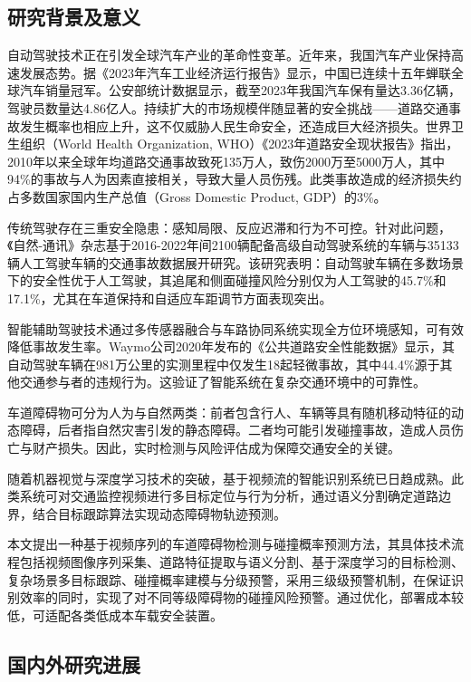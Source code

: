 \documentclass[a4paper, UTF8, fontsize=12pt]{ctexart} %
\numberwithin{equation}{section} %
\begin{document}
\subsection{研究背景及意义}

自动驾驶技术正在引发全球汽车产业的革命性变革。近年来，我国汽车产业保持高速发展态势。据《2023年汽车工业经济运行报告》\cite{auto2023}显示，中国已连续十五年蝉联全球汽车销量冠军。公安部统计数据显示，截至2023年我国汽车保有量达3.36亿辆，驾驶员数量达4.86亿人。持续扩大的市场规模伴随显著的安全挑战——道路交通事故发生概率也相应上升，这不仅威胁人民生命安全，还造成巨大经济损失。世界卫生组织（World Health Organization, WHO）《2023年道路安全现状报告》\cite{who2023}指出，2010年以来全球年均道路交通事故致死135万人，致伤2000万至5000万人，其中94\%的事故与人为因素直接相关，导致大量人员伤残。此类事故造成的经济损失约占多数国家国内生产总值（Gross Domestic Product, GDP）的3\%。

传统驾驶存在三重安全隐患：感知局限、反应迟滞和行为不可控。针对此问题，《自然-通讯》杂志基于2016-2022年间2100辆配备高级自动驾驶系统的车辆与35133辆人工驾驶车辆的交通事故数据展开研究\cite{nature2022}。该研究表明：自动驾驶车辆在多数场景下的安全性优于人工驾驶，其追尾和侧面碰撞风险分别仅为人工驾驶的45.7\%和17.1\%，尤其在车道保持和自适应车距调节方面表现突出。

智能辅助驾驶技术通过多传感器融合与车路协同系统实现全方位环境感知，可有效降低事故发生率。Waymo公司2020年发布的《公共道路安全性能数据》\cite{waymo2020}显示，其自动驾驶车辆在981万公里的实测里程中仅发生18起轻微事故，其中44.4\%源于其他交通参与者的违规行为。这验证了智能系统在复杂交通环境中的可靠性。

车道障碍物可分为人为与自然两类：前者包含行人、车辆等具有随机移动特征的动态障碍，后者指自然灾害引发的静态障碍。二者均可能引发碰撞事故，造成人员伤亡与财产损失。因此，实时检测与风险评估成为保障交通安全的关键。

随着机器视觉与深度学习技术的突破，基于视频流的智能识别系统已日趋成熟。此类系统可对交通监控视频进行多目标定位与行为分析，通过语义分割确定道路边界，结合目标跟踪算法实现动态障碍物轨迹预测。

本文提出一种基于视频序列的车道障碍物检测与碰撞概率预测方法，其具体技术流程包括视频图像序列采集、道路特征提取与语义分割、基于深度学习的目标检测、复杂场景多目标跟踪、碰撞概率建模与分级预警，采用三级级预警机制，在保证识别效率的同时，实现了对不同等级障碍物的碰撞风险预警。通过优化，部署成本较低，可适配各类低成本车载安全装置。

\subsection{国内外研究进展}
\end{document}
